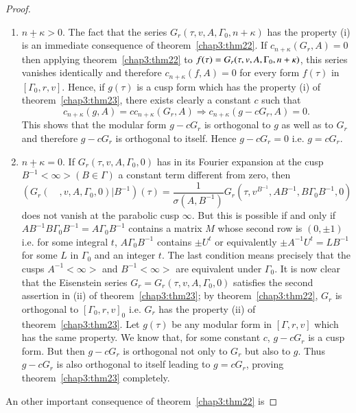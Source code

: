 \begin{proof}
\begin{enumerate}
\renewcommand{\theenumi}{\roman{enumi}}
\renewcommand{\labelenumi}{(\theenumi)}
\item $\underline{n+\kappa}>0$. The fact that the series
  $G_r(\tau,v,A,\Gamma_0,n+\kappa)$ has the property (i) is an
  immediate consequence of theorem~\ref{chap3:thm22}. If $c_{n+\kappa}(G_r,A)=0$ then
  applying theorem~\ref{chap3:thm22} to $f(\tau)=G_r(\tau, v, A,\Gamma_0,\break n+\kappa)$,
  this series vanishes identically and therefore $c_{n+\kappa}(f,A)=0$
  for every form $f(\tau)$ in $[\Gamma_0,r,v]$. Hence, if $g(\tau)$ is
  a cusp form which has the property (i) of theorem~\ref{chap3:thm23}, there exists
  clearly a constant $c$ such that
$$
c_{n+\kappa}(g,A) = cc_{n+\kappa} (G_r,A) \Longrightarrow
c_{n+\kappa}(g-cG_r,A) =0.
$$
This shows that the modular form $g-cG_r$ is orthogonal to $g$ as well
as to $G_r$ and therefore $g-cG_r$ is orthogonal to itself. Hence
$g-cG_r=0$ i.e. $g=cG_r$.

\item $\underline{n+\kappa}=0$. If $G_r(\tau, v,A,\Gamma_0,0)$ has in
  its Fourier expansion at the cusp $B^{-1}<\infty>(B\in
  \Gamma)$ a constant term different from zero, then
{\fontsize{10}{12}\selectfont
$$
(G_r(\quad,v,A,\Gamma_0,0)|B^{-1})(\tau) = \frac{1}{\sigma(A,B^{-1})}
  G_r(\tau, v^{B^{-1}}, A B^{-1}, B \Gamma_0 B^{-1},0)
$$}\relax
does not vanish at the parabolic cusp $\infty$. But this is possible
if and only if $AB^{-1}B\Gamma_0 B^{-1}=A\Gamma_0B^{-1}$ contains a
matrix $M$ whose second row is $(0,\pm 1)$ i.e. \pageoriginale for
some integral $t$, $A\Gamma_0 B^{-1}$ contains $\pm U^t$ or
equivalently $\pm A^{-1}U^t = LB^{-1}$ for some $L$ in $\Gamma_0$ and
an integer $t$. The last condition means precisely that the cusps
$A^{-1}<\infty>$ and $B^{-1}<\infty>$ are equivalent under
$\Gamma_0$. It is now clear that the Eisenstein series
$G_r=G_r(\tau,v,A,\Gamma_0,0)$ satisfies the second assertion in (ii)
of theorem~\ref{chap3:thm23}; by theorem~\ref{chap3:thm22}, $G_r$ is orthogonal to
$[\Gamma_0,r,v]_0$ i.e. $G_r$ has the property (ii) of theorem~\ref{chap3:thm23}. Let
$g(\tau)$ be any modular form in $[\Gamma, r,v]$ which has the same
property. We know that, for some constant $c$, $g-cG_r$ is a cusp
form. But then $g-cG_r$ is orthogonal not only to $G_r$ but also to
$g$. Thus $g-cG_r$ is also orthogonal to itself leading to $g=cG_r$,
proving theorem~\ref{chap3:thm23} completely.
\end{enumerate}

An other important consequence of theorem~\ref{chap3:thm22} is
\end{proof}

